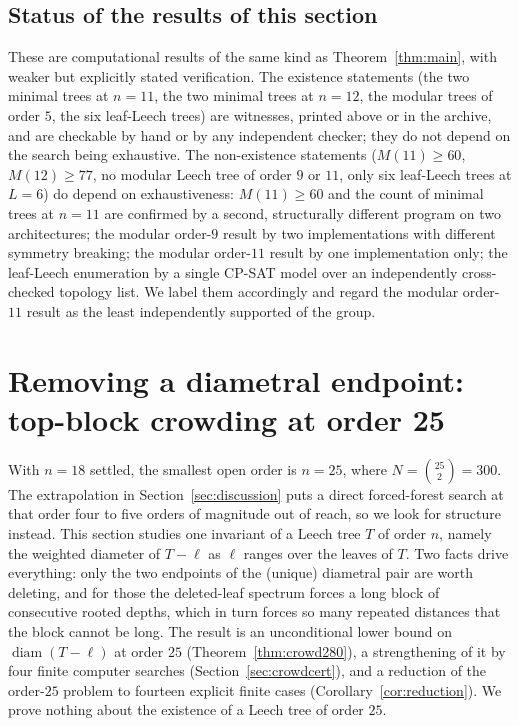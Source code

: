 \documentclass[11pt,a4paper]{article}
\theoremstyle{plain}
\theoremstyle{remark}
\newcommand{\bin}[2]{\binom{#1}{#2}}
\newcommand{\diam}{\operatorname{diam}}
\begin{document}
\subsection{Status of the results of this section}\label{sec:variantstatus}

These are computational results of the same kind as Theorem~\ref{thm:main}, with
weaker but explicitly stated verification.  The existence statements
(the two minimal trees at $n=11$, the two minimal trees at $n=12$, the modular trees of
order $5$, the six leaf-Leech trees) are witnesses, printed above or in the
archive, and are checkable by hand or by any independent checker; they do not
depend on the search being exhaustive.  The non-existence statements
($M(11)\ge 60$, $M(12)\ge 77$, no modular Leech tree of order $9$ or $11$, only
six leaf-Leech trees at $L=6$) do depend on exhaustiveness: $M(11)\ge 60$ and the
count of minimal trees at $n=11$ are confirmed by a second, structurally
different program on two architectures; the modular order-$9$ result by two
implementations with different symmetry breaking; the modular order-$11$ result
by one implementation only; the leaf-Leech enumeration by a single CP-SAT model
over an independently cross-checked topology list.  We label them accordingly and
regard the modular order-$11$ result as the least independently supported of the
group.

\section{Removing a diametral endpoint: top-block crowding at order 25}
\label{sec:crowding}

With $n=18$ settled, the smallest open order is $n=25$, where $N=\bin{25}2=300$.
The extrapolation in Section~\ref{sec:discussion} puts a direct forced-forest
search at that order four to five orders of magnitude out of reach, so we look
for structure instead.  This section studies one invariant of a Leech tree $T$
of order $n$, namely the weighted diameter of $T-\ell$ as $\ell$ ranges over the
leaves of $T$.  Two facts drive everything: only the two endpoints of the
(unique) diametral pair are worth deleting, and for those the deleted-leaf
spectrum forces a long block of consecutive rooted depths, which in turn forces
so many repeated distances that the block cannot be long.  The result is an
unconditional lower bound on $\diam(T-\ell)$ at order $25$
(Theorem~\ref{thm:crowd280}), a strengthening of it by four finite computer
searches (Section~\ref{sec:crowdcert}), and a reduction of the order-$25$
problem to fourteen explicit finite cases (Corollary~\ref{cor:reduction}).  We
prove nothing about the existence of a Leech tree of order $25$.
\end{document}
